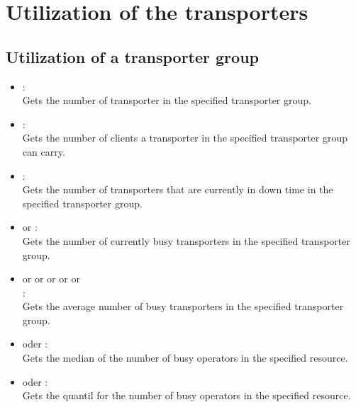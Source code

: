 \section{Utilization of the transporters}



\subsection{Utilization of a transporter group}

\begin{itemize}
  
\item
{}:\\
Gets the number of transporter in the specified transporter group.

\item
{}:\\
Gets the number of clients a transporter in the specified transporter group can carry.
  
\item
{}:\\
Gets the number of transporters that are currently in down time in the specified transporter group.
  
\item
{} or :\\
Gets the number of currently busy transporters in the specified transporter group.
  
\item
{} or  or  or  or  or\\
:\\
Gets the average number of busy transporters in the specified transporter group.

\item
{} oder :\\
Gets the median of the number of busy operators in the specified resource.
  
\item
{} oder :\\
Gets the quantil for the number of busy operators in the specified resource.


\end{itemize}
